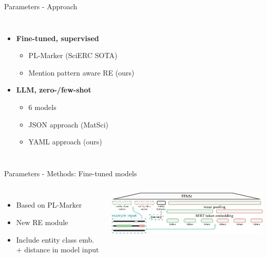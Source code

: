 \documentclass[en,16:9,smallfoot]{sdqbeamer}
\begin{document}
   \begin{frame}{Parameters - Approach}
   \begin{columns}
           \begin{itemize}
               \item \textbf{Fine-tuned, supervised}
               \begin{itemize}
                   \item PL-Marker (SciERC SOTA)
                   \item Mention pattern aware RE (ours)
               \end{itemize}
               \item \textbf{LLM, zero-/few-shot}
               \begin{itemize}
                   \item 6 models
                   \item JSON approach (MatSci)
                   \item YAML approach (ours)
               \end{itemize}
           \end{itemize}
            \ 
   \end{columns}
   \end{frame}

   \begin{frame}{Parameters - Methods: Fine-tuned models}
   \begin{columns}
           \begin{itemize}
               \item Based on PL-Marker %
               \item New RE module
               \item Include entity class emb. + distance in model input
           \end{itemize}
           \includegraphics[width=\linewidth]{imgs/ffnn_re_sub_visual_v2}
   \end{columns}
   \end{frame}
\end{document}
